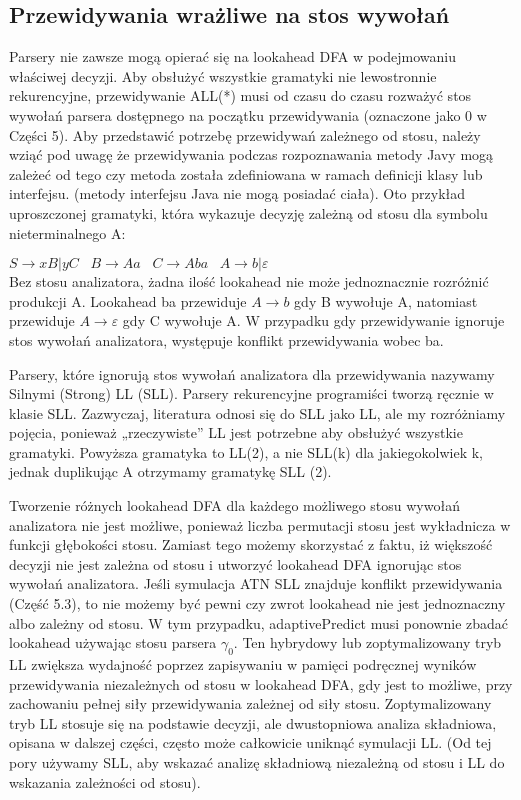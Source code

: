 ﻿\subsection{Przewidywania wrażliwe na stos wywołań}
Parsery nie zawsze mogą opierać się na lookahead DFA w podejmowaniu właściwej decyzji.
Aby obsłużyć wszystkie gramatyki nie lewostronnie rekurencyjne,
przewidywanie ALL(*) musi od czasu do czasu rozważyć stos wywołań parsera
dostępnego na początku przewidywania (oznaczone jako 0 w Części 5).
Aby przedstawić potrzebę przewidywań zależnego od stosu, należy wziąć pod uwagę
że przewidywania podczas rozpoznawania metody Javy mogą zależeć od tego
czy metoda została zdefiniowana w ramach definicji klasy lub interfejsu.
(metody interfejsu Java nie mogą posiadać ciała).
Oto przykład uproszczonej gramatyki, która wykazuje decyzję zależną od stosu dla symbolu nieterminalnego A:
\par
\( S \rightarrow xB|yC  \;\;\; B \rightarrow Aa \;\;\; C \rightarrow Aba \;\;\; A \rightarrow b|\varepsilon\)
\\
Bez stosu analizatora, żadna ilość lookahead nie może jednoznacznie rozróżnić
produkcji A. Lookahead ba przewiduje \(A \rightarrow b\) gdy B wywołuje A,
natomiast przewiduje \(A \rightarrow \varepsilon \) gdy C wywołuje A.
W przypadku gdy przewidywanie ignoruje stos wywołań analizatora,
występuje konflikt przewidywania wobec ba.
\par
Parsery, które ignorują stos wywołań analizatora dla przewidywania nazywamy
Silnymi (Strong) LL (SLL). Parsery rekurencyjne programiści tworzą ręcznie
w klasie SLL. Zazwyczaj, literatura odnosi się do SLL jako LL,
ale my rozróżniamy pojęcia, ponieważ „rzeczywiste” LL jest potrzebne aby
obsłużyć wszystkie gramatyki. Powyższa gramatyka to LL(2), a nie SLL(k) dla
jakiegokolwiek k, jednak duplikując A otrzymamy gramatykę SLL (2).
\par
Tworzenie różnych lookahead DFA dla każdego możliwego stosu wywołań
analizatora nie jest możliwe, ponieważ liczba permutacji stosu jest
wykładnicza w funkcji głębokości stosu.
Zamiast tego możemy skorzystać z faktu, iż większość decyzji nie jest zależna
od stosu i utworzyć lookahead DFA ignorując stos wywołań analizatora.
Jeśli symulacja ATN SLL znajduje konflikt przewidywania (Część 5.3),
to nie możemy być pewni czy zwrot lookahead nie jest jednoznaczny
albo zależny od stosu. 
W tym przypadku, adaptivePredict musi ponownie zbadać lookahead używając stosu parsera $\gamma_0$.
Ten hybrydowy lub zoptymalizowany tryb LL zwiększa wydajność poprzez zapisywaniu
w pamięci podręcznej wyników przewidywania niezależnych od stosu w lookahead DFA,
gdy jest to możliwe, przy zachowaniu pełnej siły przewidywania zależnej od siły stosu.
Zoptymalizowany tryb LL stosuje się na podstawie decyzji,
ale dwustopniowa analiza składniowa, opisana w dalszej części,
często może całkowicie uniknąć symulacji LL.
(Od tej pory używamy SLL, aby wskazać analizę składniową niezależną od stosu
i LL do wskazania zależności od stosu).
